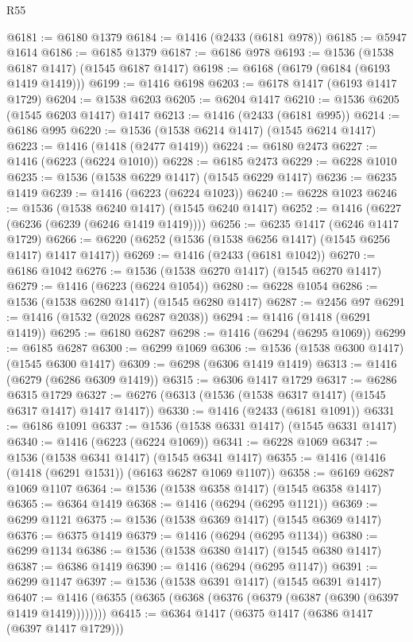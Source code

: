 \begin{lexlean}{R55}
\begin{coremodule}
{{@6181 := @6180 @1379
@6184 := @1416 (@2433 (@6181 @978))
@6185 := @5947 @1614
@6186 := @6185 @1379
@6187 := @6186 @978
@6193 := @1536 (@1538 @6187 @1417) (@1545 @6187 @1417)
@6198 := @6168 (@6179 (@6184 (@6193 @1419 @1419)))
@6199 := @1416 @6198
@6203 := @6178 @1417 (@6193 @1417 @1729)
@6204 := @1538 @6203
@6205 := @6204 @1417
@6210 := @1536 @6205 (@1545 @6203 @1417) @1417
@6213 := @1416 (@2433 (@6181 @995))
@6214 := @6186 @995
@6220 := @1536 (@1538 @6214 @1417) (@1545 @6214 @1417)
@6223 := @1416 (@1418 (@2477 @1419))
@6224 := @6180 @2473
@6227 := @1416 (@6223 (@6224 @1010))
@6228 := @6185 @2473
@6229 := @6228 @1010
@6235 := @1536 (@1538 @6229 @1417) (@1545 @6229 @1417)
@6236 := @6235 @1419
@6239 := @1416 (@6223 (@6224 @1023))
@6240 := @6228 @1023
@6246 := @1536 (@1538 @6240 @1417) (@1545 @6240 @1417)
@6252 := @1416 (@6227 (@6236 (@6239 (@6246 @1419 @1419))))
@6256 := @6235 @1417 (@6246 @1417 @1729)
@6266 := @6220 (@6252 (@1536 (@1538 @6256 @1417) (@1545 @6256 @1417) @1417 @1417))
@6269 := @1416 (@2433 (@6181 @1042))
@6270 := @6186 @1042
@6276 := @1536 (@1538 @6270 @1417) (@1545 @6270 @1417)
@6279 := @1416 (@6223 (@6224 @1054))
@6280 := @6228 @1054
@6286 := @1536 (@1538 @6280 @1417) (@1545 @6280 @1417)
@6287 := @2456 @97
@6291 := @1416 (@1532 (@2028 @6287 @2038))
@6294 := @1416 (@1418 (@6291 @1419))
@6295 := @6180 @6287
@6298 := @1416 (@6294 (@6295 @1069))
@6299 := @6185 @6287
@6300 := @6299 @1069
@6306 := @1536 (@1538 @6300 @1417) (@1545 @6300 @1417)
@6309 := @6298 (@6306 @1419 @1419)
@6313 := @1416 (@6279 (@6286 @6309 @1419))
@6315 := @6306 @1417 @1729
@6317 := @6286 @6315 @1729
@6327 := @6276 (@6313 (@1536 (@1538 @6317 @1417) (@1545 @6317 @1417) @1417 @1417))
@6330 := @1416 (@2433 (@6181 @1091))
@6331 := @6186 @1091
@6337 := @1536 (@1538 @6331 @1417) (@1545 @6331 @1417)
@6340 := @1416 (@6223 (@6224 @1069))
@6341 := @6228 @1069
@6347 := @1536 (@1538 @6341 @1417) (@1545 @6341 @1417)
@6355 := @1416 (@1416 (@1418 (@6291 @1531)) (@6163 @6287 @1069 @1107))
@6358 := @6169 @6287 @1069 @1107
@6364 := @1536 (@1538 @6358 @1417) (@1545 @6358 @1417)
@6365 := @6364 @1419
@6368 := @1416 (@6294 (@6295 @1121))
@6369 := @6299 @1121
@6375 := @1536 (@1538 @6369 @1417) (@1545 @6369 @1417)
@6376 := @6375 @1419
@6379 := @1416 (@6294 (@6295 @1134))
@6380 := @6299 @1134
@6386 := @1536 (@1538 @6380 @1417) (@1545 @6380 @1417)
@6387 := @6386 @1419
@6390 := @1416 (@6294 (@6295 @1147))
@6391 := @6299 @1147
@6397 := @1536 (@1538 @6391 @1417) (@1545 @6391 @1417)
@6407 := @1416 (@6355 (@6365 (@6368 (@6376 (@6379 (@6387 (@6390 (@6397 @1419 @1419))))))))
@6415 := @6364 @1417 (@6375 @1417 (@6386 @1417 (@6397 @1417 @1729)))
}}
\end{coremodule}
\end{lexlean}
